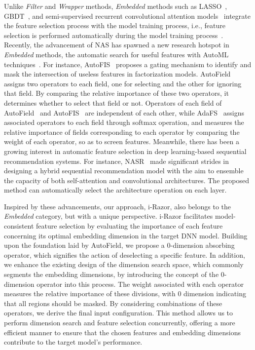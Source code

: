 \documentclass[10pt,journal,compsoc]{IEEEtran}
\begin{document}
Unlike \textit{Filter} and \textit{Wrapper} methods, \textit{Embedded} methods such as LASSO~\cite{liu2015pairwise}, GBDT~\cite{friedman2001greedy},  {and semi-supervised recurrent convolutional attention models~\cite{chen2019semisupervised}} integrate the feature selection process with the model training process, i.e., feature selection is performed automatically during the model training process~\cite{chandrashekar2014survey}. 
 {Recently, the advancement of NAS has spawned a new research hotspot in \textit{Embedded} methods, the automatic search for useful features with AutoML techniques~\cite{zheng2023automl,cheng2022towards}.}
For instance, AutoFIS~\cite{liu2020autofis} proposes a gating mechanism to identify and mask the intersection of useless features in factorization models.
 {AutoField~\cite{wang2022autofield} assigns two operators to each field, one for selecting and the other for ignoring that field. By comparing the relative importance of these two operators, it determines whether to select that field or not. 
Operators of each field of AutoField~\cite{wang2022autofield} and AutoFIS~\cite{liu2020autofis} are independent of each other, while AdaFS~\cite{lin2022adafs} assigns associated operators to each field through softmax operation, and measures the relative importance of fields corresponding to each operator by comparing the weight of each operator, so as to screen features.
}
 {Meanwhile, there has been a growing interest in automatic feature selection in deep learning-based sequential recommendation systems. For instance, NASR~\cite{cheng2022towards} made significant strides in designing a hybrid sequential recommendation model with the aim to ensemble the capacity of both self-attention and convolutional architectures. The proposed method can automatically select the architecture operation on each layer.}

 {Inspired by these advancements, our approach, i-Razor, also belongs to the \textit{Embedded} category, but with a unique perspective. i-Razor facilitates model-consistent feature selection by evaluating the importance of each feature concerning its optimal embedding dimension in the target DNN model. Building upon the foundation laid by AutoField, we propose a 0-dimension absorbing operator, which signifies the action of deselecting a specific feature. In addition, we enhance the existing design of the dimension search space, which commonly segments the embedding dimensions, by introducing the concept of the 0-dimension operator into this process. The weight associated with each operator measures the relative importance of these divisions, with 0 dimension indicating that all regions should be masked. By considering combinations of these operators, we derive the final input configuration. This method allows us to perform dimension search and feature selection concurrently, offering a more efficient manner to ensure that the chosen features and embedding dimensions contribute to the target model's performance.}
\end{document}
